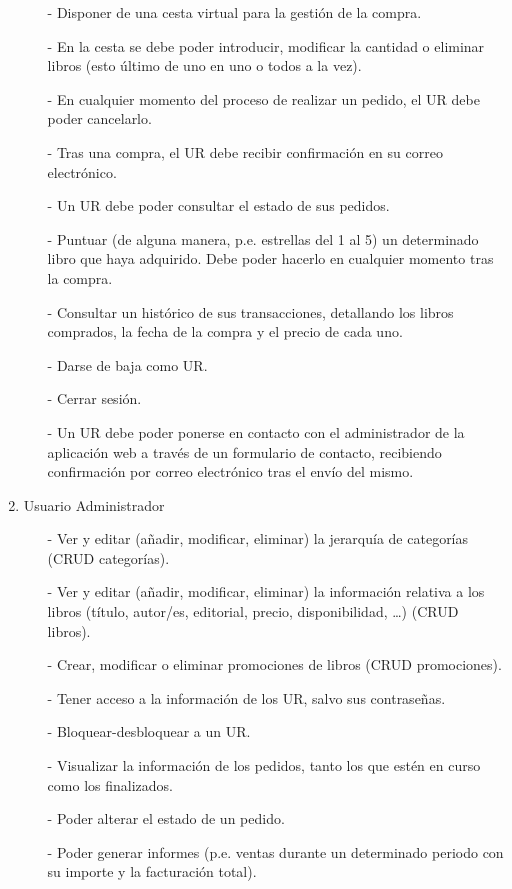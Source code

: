 \documentclass[a4paper]{article}
\begin{document}
\begin{enumerate}
\begin{itemize}
                    \item[-] Disponer de una cesta virtual para la gestión de la compra.
                    \item[-] En la cesta se debe poder introducir, modificar la cantidad o eliminar libros (esto último de uno en uno o todos a la vez).
                    \item[-] En cualquier momento del proceso de realizar un pedido, el UR debe poder cancelarlo.
                    \item[-] Tras una compra, el UR debe recibir confirmación en su correo electrónico.
                    \item[-] Un UR debe poder consultar el estado de sus pedidos.
                    \item[-] Puntuar (de alguna manera, p.e. estrellas del 1 al 5) un determinado libro que haya adquirido. Debe poder hacerlo en cualquier momento tras la compra.
                    \item[-] Consultar un histórico de sus transacciones, detallando los libros comprados, la fecha de la compra y el precio de cada uno.
                    \item[-] Darse de baja como UR.
                    \item[-] Cerrar sesión.
                    \item[-] Un UR debe poder ponerse en contacto con el administrador de la aplicación web a través de un formulario de contacto, recibiendo confirmación por correo electrónico tras el envío del mismo.
                \end{itemize}
                \item Usuario Administrador
                \begin{itemize}
                    \item[-] Ver y editar (añadir, modificar, eliminar) la jerarquía de categorías (CRUD categorías).
                    \item[-] Ver y editar (añadir, modificar, eliminar) la información relativa a los libros (título, autor/es, editorial, precio, disponibilidad, \ldots) (CRUD libros).
                    \item[-] Crear, modificar o eliminar promociones de libros (CRUD promociones).
                    \item[-] Tener acceso a la información de los UR, salvo sus contraseñas.
                    \item[-] Bloquear-desbloquear a un UR.
                    \item[-] Visualizar la información de los pedidos, tanto los que estén en curso como los finalizados.
                    \item[-] Poder alterar el estado de un pedido.
                    \item[-] Poder generar informes (p.e. ventas durante un determinado periodo con su importe y la facturación total).
                \end{itemize}
            \end{enumerate}
\end{document}
